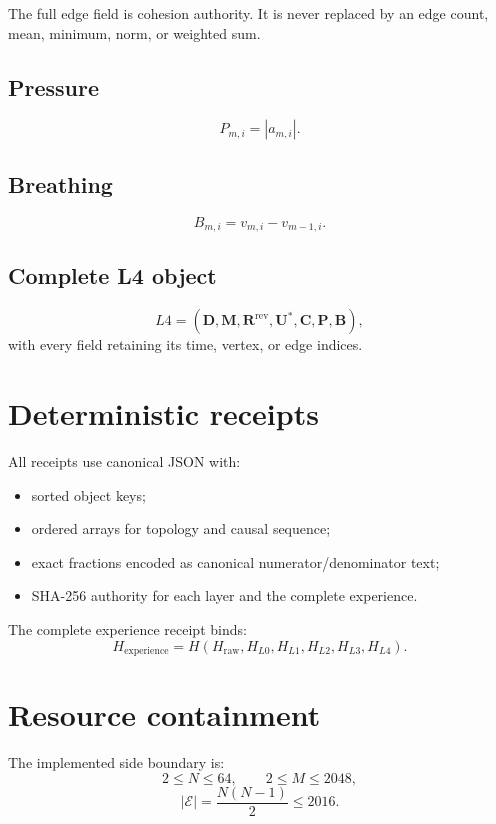 \documentclass[11pt]{article}
\begin{document}
The full edge field is cohesion authority. It is never replaced by an edge
count, mean, minimum, norm, or weighted sum.

\subsection{Pressure}

\[
  P_{m,i}=|a_{m,i}|.
\]

\subsection{Breathing}

\[
  B_{m,i}=v_{m,i}-v_{m-1,i}.
\]

\subsection{Complete L4 object}

\[
  L4
  =
  \left(
    \mathbf{D},
    \mathbf{M},
    \mathbf{R}^{\mathrm{rev}},
    \mathbf{U}^{*},
    \mathbf{C},
    \mathbf{P},
    \mathbf{B}
  \right),
\]
with every field retaining its time, vertex, or edge indices.

\section{Deterministic receipts}

All receipts use canonical JSON with:

\begin{itemize}[nosep]
  \item sorted object keys;
  \item ordered arrays for topology and causal sequence;
  \item exact fractions encoded as canonical numerator/denominator text;
  \item SHA-256 authority for each layer and the complete experience.
\end{itemize}

The complete experience receipt binds:
\[
  H_{\mathrm{experience}}
  =
  H(H_{\mathrm{raw}},H_{L0},H_{L1},H_{L2},H_{L3},H_{L4}).
\]

\section{Resource containment}

The implemented side boundary is:
\[
  2\leq N\leq64,
\qquad
  2\leq M\leq2048,
\]
\[
  |\mathcal{E}|=\frac{N(N-1)}{2}\leq2016.
\]
\end{document}
